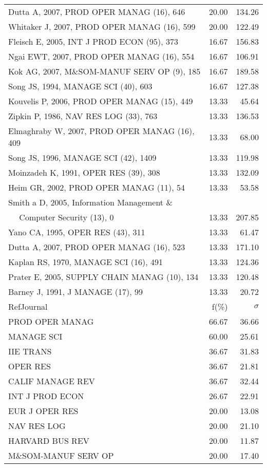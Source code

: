 \documentclass[a4paper,11pt]{report}
\begin{document}
\begin{landscape}
\begin{table}[!ht]
{\begin{tabular}{|l r r|}
Dutta A, 2007, PROD OPER MANAG (16), 646 & 20.00 & 134.26\\
Whitaker J, 2007, PROD OPER MANAG (16), 599 & 20.00 & 122.49\\
Fleisch E, 2005, INT J PROD ECON (95), 373 & 16.67 & 156.83\\
Ngai EWT, 2007, PROD OPER MANAG (16), 554 & 16.67 & 106.91\\
Kok AG, 2007, M\&SOM-MANUF SERV OP (9), 185 & 16.67 & 189.58\\
Song JS, 1994, MANAGE SCI (40), 603 & 16.67 & 127.38\\
Kouvelis P, 2006, PROD OPER MANAG (15), 449 & 13.33 & 45.64\\
Zipkin P, 1986, NAV RES LOG (33), 763 & 13.33 & 136.53\\
Elmaghraby W, 2007, PROD OPER MANAG (16), 409 & 13.33 & 68.00\\
Song JS, 1996, MANAGE SCI (42), 1409 & 13.33 & 119.98\\
Moinzadeh K, 1991, OPER RES (39), 308 & 13.33 & 132.09\\
Heim GR, 2002, PROD OPER MANAG (11), 54 & 13.33 & 53.58\\
Smith a D, 2005, Information Management \& &  & \\
$\quad$ Computer Security (13), 0 & 13.33 & 207.85\\
Yano CA, 1995, OPER RES (43), 311 & 13.33 & 61.47\\
Dutta A, 2007, PROD OPER MANAG (16), 523 & 13.33 & 171.10\\
Kaplan RS, 1970, MANAGE SCI (16), 491 & 13.33 & 124.36\\
Prater E, 2005, SUPPLY CHAIN MANAG (10), 134 & 13.33 & 120.48\\
Barney J, 1991, J MANAGE (17), 99 & 13.33 & 20.72\\
\hline
\hline
RefJournal & f(\%) & $\sigma$\\
\hline
PROD OPER MANAG & 66.67 & 36.66\\
MANAGE SCI & 60.00 & 25.61\\
IIE TRANS & 36.67 & 31.83\\
OPER RES & 36.67 & 21.81\\
CALIF MANAGE REV & 36.67 & 32.44\\
INT J PROD ECON & 26.67 & 22.91\\
EUR J OPER RES & 20.00 & 13.08\\
NAV RES LOG & 20.00 & 21.10\\
HARVARD BUS REV & 20.00 & 11.87\\
M\&SOM-MANUF SERV OP & 20.00 & 17.40\\
\hline
\end{tabular}
}
\end{table}

\end{landscape}
\end{document}
